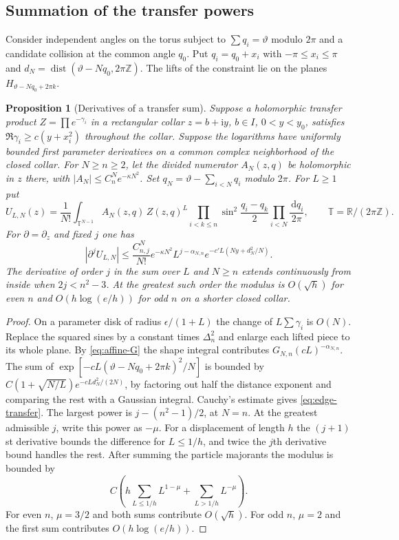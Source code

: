 \documentclass[11pt]{article}
\numberwithin{equation}{section}
\newtheorem{proposition}[theorem]{Proposition}
\theoremstyle{definition}
\newcommand{\R}{\mathbb R}
\newcommand{\Z}{\mathbb Z}
\newcommand{\ii}{\mathrm i}
\newcommand{\dd}{\,\mathrm d}
\DeclareMathOperator{\dist}{dist}
\begin{document}
\subsection{Summation of the transfer powers}

Consider independent angles on the torus subject to
$\sum q_i=\vartheta$ modulo $2\pi$ and a candidate collision
at the common angle $q_0$. Put $q_i=q_0+x_i$ with
$-\pi\le x_i\le\pi$ and
$d_N=\dist(\vartheta-Nq_0,2\pi\Z)$. The lifts of the constraint
lie on the planes $H_{\vartheta-Nq_0+2\pi k}$.

\begin{proposition}[Derivatives of a transfer sum]\label{p:transfer}
Suppose a holomorphic transfer product $Z=\prod e^{-\gamma_i}$
in a rectangular collar $z=b+\ii y$, $b\in I$, $0<y<y_0$, satisfies
$\Re\gamma_i\ge c(y+x_i^2)$ throughout the collar.
Suppose the logarithms have uniformly
bounded first parameter derivatives on a common complex neighborhood of the closed collar.
For $N\ge n\ge2$, let the divided numerator $A_N(z,q)$ be
holomorphic in $z$ there, with $|A_N|\le C_n^N e^{-\kappa N^2}$.
Set $q_N=\vartheta-\sum_{i<N}q_i$ modulo $2\pi$. For $L\ge1$ put
\[
 U_{L,N}(z)=\frac{1}{N!}\int_{\mathbb T^{N-1}}
 A_N(z,q)\,Z(z,q)^L
 \prod_{i<k\le n}\sin^2\!\frac{q_i-q_k}{2}
 \prod_{i<N}\frac{\dd q_i}{2\pi},\qquad \mathbb T=\R/(2\pi\Z).
\]
For $\partial=\partial_z$ and fixed $j$ one has
\begin{equation}\label{eq:edge-transfer}
 |\partial^j U_{L,N}|
 \le\frac{C_{n,j}^N}{N!}e^{-\kappa N^2}
       L^{j-\alpha_{N,n}}e^{-c' L(Ny+d_N^2/N)} .
\end{equation}
The derivative of order $j$ in the sum over $L$ and $N\ge n$
extends continuously from inside when $2j<n^2-3$. At the greatest
such order the modulus is $O(\sqrt h)$ for even $n$ and
$O(h\log(e/h))$ for odd $n$ on a shorter closed collar.
\end{proposition}
\begin{proof}
On a parameter disk of radius $\epsilon/(1+L)$ the change of
$L\sum\gamma_i$ is $O(N)$. Replace the squared sines by a
constant times $\Delta_n^2$ and enlarge each lifted piece to its
whole plane. By \eqref{eq:affine-G} the shape integral contributes
$G_{N,n}(cL)^{-\alpha_{N,n}}$.
The sum of $\exp[-cL(\vartheta-Nq_0+2\pi k)^2/N]$ is bounded by
$C(1+\sqrt{N/L})e^{-cLd_N^2/(2N)}$, by factoring out half the
distance exponent and comparing the rest with a Gaussian integral.
Cauchy's estimate gives \eqref{eq:edge-transfer}.
The largest power is $j-(n^2-1)/2$, at $N=n$. At the greatest
admissible $j$, write this power as $-\mu$. For a displacement of
length $h$ the $(j+1)$st derivative bounds the difference for
$L\le1/h$, and twice the $j$th derivative bound handles the rest.
After summing the particle majorants the modulus is bounded by
\[
 C\left(h\sum_{L\le1/h}L^{1-\mu}+
              \sum_{L>1/h}L^{-\mu}\right).
\]
For even $n$, $\mu=3/2$ and both sums contribute $O(\sqrt h)$.
For odd $n$, $\mu=2$ and the first sum contributes $O(h\log(e/h))$.
\end{proof}
\end{document}
